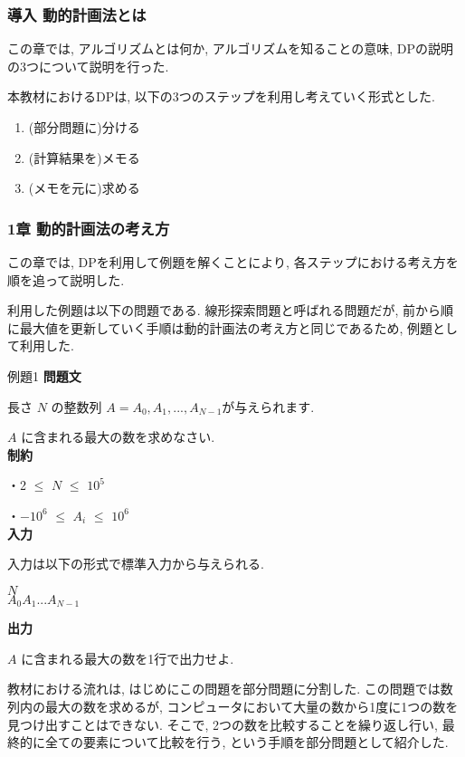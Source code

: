 \subsubsection{導入 動的計画法とは}
この章では, アルゴリズムとは何か, アルゴリズムを知ることの意味, DPの説明の3つについて説明を行った. 

本教材におけるDPは, 以下の3つのステップを利用し考えていく形式とした. 

\begin{enumerate}
    \item (部分問題に)分ける
    \item (計算結果を)メモる
    \item (メモを元に)求める
\end{enumerate}

\subsubsection{1章 動的計画法の考え方}
この章では, DPを利用して例題を解くことにより, 各ステップにおける考え方を順を追って説明した. 

利用した例題は以下の問題である. 
線形探索問題と呼ばれる問題だが, 前から順に最大値を更新していく手順は動的計画法の考え方と同じであるため, 例題として利用した. 

\begin{itembox}[l]{例題1}
    \textbf{問題文}
    
    長さ $N$ の整数列 $A = {A_0, A_1, ..., A_{N-1}}$が与えられます. 

    $A$ に含まれる最大の数を求めなさい. 
    \\
    
    \textbf{制約}

    ・2 $\leq$ $N$ $\leq$ $10^5$
    
    ・$-10^6$ $\leq$ $A_i$ $\leq$ $10^6$
    \\
    
    \textbf{入力}
    
    入力は以下の形式で標準入力から与えられる. 
    
    $N$ \\
    $A_0 A_1 ... A_{N-1}$
    
    \textbf{出力}
    
    $A$ に含まれる最大の数を1行で出力せよ. 
\end{itembox}

教材における流れは, はじめにこの問題を部分問題に分割した. 
この問題では数列内の最大の数を求めるが, コンピュータにおいて大量の数から1度に1つの数を見つけ出すことはできない. 
そこで, 2つの数を比較することを繰り返し行い, 最終的に全ての要素について比較を行う, という手順を部分問題として紹介した. 

